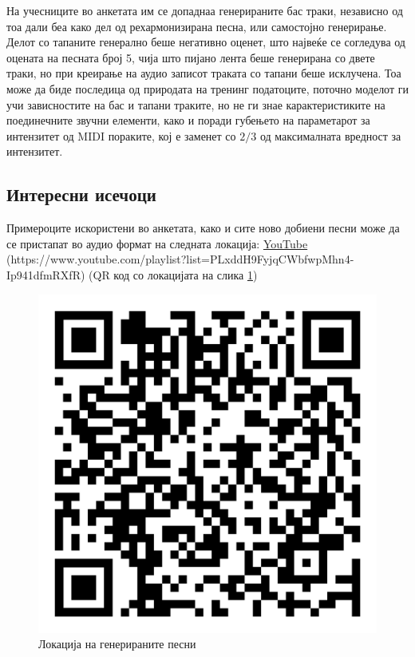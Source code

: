 На учесниците во анкетата им се допаднаа генерираните бас траки, независно од тоа дали беа како дел од рехармонизирана песна, или самостојно генерирање. Делот со тапаните генерално беше негативно оценет, што највеќе се согледува од оцената на песната број 5, чија што пијано лента беше генерирана со двете траки, но при креирање на аудио записот траката со тапани беше исклучена. Тоа може да биде последица од природата на тренинг податоците, поточно моделот ги учи зависностите на бас и тапани траките, но не ги знае карактеристиките на поединечните звучни елементи, како и поради губењето на параметарот за интензитет од MIDI пораките, кој е заменет со $2/3$ од максималната вредност за интензитет.

\newpage
\subsection{Интересни исечоци}

Примероците искористени во анкетата, како и сите ново добиени песни може да се пристапат во аудио формат на следната локација: \href{https://www.youtube.com/playlist?list=PLxddH9FyjqCWbfwpMhn4-Ip941dfmRXfR}{YouTube} (https://www.youtube.com/playlist?list=PLxddH9FyjqCWbfwpMhn4-Ip941dfmRXfR) (QR код со локацијата на слика \ref{fig:qr_code})

\begin{figure}[H]
	\centering
    \includegraphics[scale=0.18]{images/playlist_qr_code.png}
	\caption{Локација на генерираните песни}
	\label{fig:qr_code}
\end{figure}

